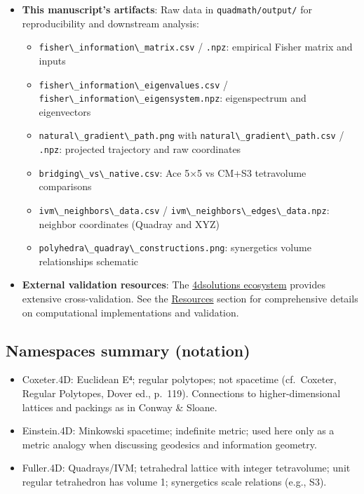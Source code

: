 \documentclass[
  10pt,
]{article}
\newcommand{\passthrough}[1]{#1}
\providecommand{\tightlist}{%
  \setlength{\itemsep}{0pt}\setlength{\parskip}{0pt}}
\begin{document}
\begin{itemize}
\tightlist
\item
  \textbf{This manuscript's artifacts}: Raw data in
  \passthrough{\lstinline!quadmath/output/!} for reproducibility and
  downstream analysis:

  \begin{itemize}
  \item
    \passthrough{\lstinline!fisher\_information\_matrix.csv!} /
    \passthrough{\lstinline!.npz!}: empirical Fisher matrix and inputs
  \item
    \passthrough{\lstinline!fisher\_information\_eigenvalues.csv!} /
    \passthrough{\lstinline!fisher\_information\_eigensystem.npz!}:
    eigenspectrum and eigenvectors
  \item
    \passthrough{\lstinline!natural\_gradient\_path.png!} with
    \passthrough{\lstinline!natural\_gradient\_path.csv!} /
    \passthrough{\lstinline!.npz!}: projected trajectory and raw
    coordinates
  \item
    \passthrough{\lstinline!bridging\_vs\_native.csv!}: Ace 5×5 vs CM+S3
    tetravolume comparisons
  \item
    \passthrough{\lstinline!ivm\_neighbors\_data.csv!} /
    \passthrough{\lstinline!ivm\_neighbors\_edges\_data.npz!}: neighbor
    coordinates (Quadray and XYZ)
  \item
    \passthrough{\lstinline!polyhedra\_quadray\_constructions.png!}:
    synergetics volume relationships schematic
  \end{itemize}
\item
  \textbf{External validation resources}: The
  \href{https://github.com/4dsolutions}{4dsolutions ecosystem} provides
  extensive cross-validation. See the \href{07_resources.md}{Resources}
  section for comprehensive details on computational implementations and
  validation.
\end{itemize}

\hypertarget{namespaces-summary-notation}{%
\subsection{Namespaces summary
(notation)}\label{namespaces-summary-notation}}

\begin{itemize}
\tightlist
\item
  Coxeter.4D: Euclidean E⁴; regular polytopes; not spacetime
  (cf.~Coxeter, Regular Polytopes, Dover ed., p.~119). Connections to
  higher-dimensional lattices and packings as in Conway \& Sloane.
\item
  Einstein.4D: Minkowski spacetime; indefinite metric; used here only as
  a metric analogy when discussing geodesics and information geometry.
\item
  Fuller.4D: Quadrays/IVM; tetrahedral lattice with integer tetravolume;
  unit regular tetrahedron has volume 1; synergetics scale relations
  (e.g., S3). 
\end{itemize}
\end{document}
